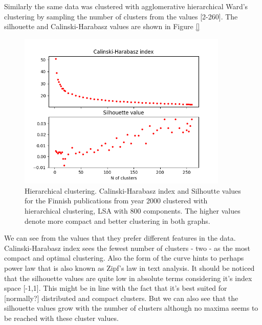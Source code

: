 Similarly the same data was clustered with agglomerative 
hierarchical Ward's clustering by sampling the number of clusters 
from the values [2-260]. The silhouette and Calinski-Harabasz values
are shown in Figure \ref{}
\begin{figure}[ht]
  \begin{center}    
\includegraphics[width=10cm]{images/c-h-silh-index-plot-y2000-2_260-800-hierarchical.png}
    \caption{Hierarchical clustering. Calinski-Harabasz index and Silhoutte values for the
    Finnish publications from year 2000 clustered with hierarchical
    clustering, LSA with 800 components. The higher values denote 
    more compact and better clustering in both graphs.}
    \label{fig:ch-silh-2000-01}
  \end{center}
\end{figure}
We can see from the values that they prefer different features in
the data. Calinski-Harabasz index sees the fewest number of 
clusters - two - as the most compact and optimal clustering. Also
the form of the curve hints to perhaps power law that is also 
known as Zipf's law in text analysis. 
It should be noticed that the silhouette values are quite low 
in absolute terms considering it's index space [-1,1]. This might 
be in line with the fact that it's best suited for [normally?] 
distributed and compact clusters. But we can also see that the 
silhouette values grow with the number of clusters although no
maxima seems to be reached with these cluster values.



